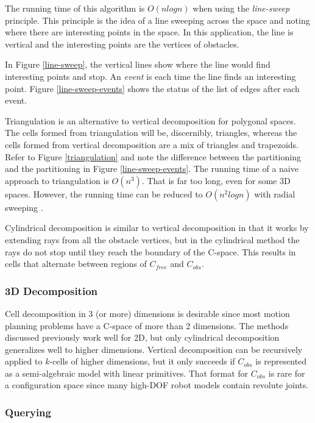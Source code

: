 \documentclass[10pt,conference]{ieeeconf}
\begin{document}
The running time of this algorithm is $O(nlogn)$ when using the \emph{line-sweep} principle. This principle is the idea of a line sweeping across the space and noting where there are interesting points in the space. In this application, the line is vertical and the interesting points are the vertices of obstacles.

In Figure \ref{line-sweep}, the vertical lines show where the line would find interesting points and stop. An \emph{event} is each time the line finds an interesting point. Figure \ref{line-sweep-events} shows the status of the list of edges after each event.

Triangulation \cite{something} is an alternative to vertical decomposition for polygonal spaces. The cells formed from triangulation will be, discernibly, triangles, whereas the cells formed from vertical decomposition are a mix of triangles and trapezoids. Refer to Figure \ref{triangulation} and note the difference between the partitioning and the partitioning in Figure \ref{line-sweep-events}. The running time of a naive approach to triangulation is $O(n^3)$. That is far too long, even for some 3D spaces. However, the running time can be reduced to $O(n^2logn)$ with radial sweeping \cite{something}.

Cylindrical decomposition \cite{something} is similar to vertical decomposition in that it works by extending rays from all the obstacle vertices, but in the cylindrical method the rays do not stop until they reach the boundary of the C-space. This results in cells that alternate between regions of $C_{free}$ and $C_{obs}$. 

\subsubsection{3D Decomposition}

Cell decomposition in 3 (or more) dimensions is desirable since most motion planning problems have a C-space of more than 2 dimensions. The methods discussed previously work well for 2D, but only cylindrical decomposition generalizes well to higher dimensions. Vertical decomposition can be recursively applied to $k$-cells of higher dimensions, but it only succeeds if $C_{obs}$ is represented as a semi-algebraic model with linear primitives. That format for $C_{obs}$ is rare for a configuration space since many high-DOF robot models contain revolute joints.

\subsubsection{Querying}
\end{document}
